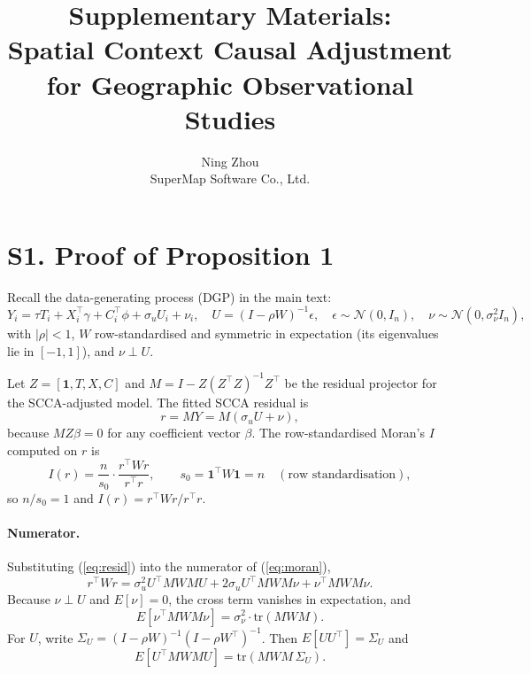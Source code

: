 \documentclass{article}
\title{Supplementary Materials:\\
Spatial Context Causal Adjustment for Geographic Observational Studies}
\author{Ning Zhou\\SuperMap Software Co., Ltd.}
\date{}
\begin{document}
\maketitle

\section{S1. Proof of Proposition 1}

Recall the data-generating process (DGP) in the main text:
\begin{equation}
Y_i = \tau T_i + X_i^\top \gamma + C_i^\top \phi + \sigma_u U_i + \nu_i,
\quad
U = (I - \rho W)^{-1}\epsilon,
\quad \epsilon \sim \mathcal{N}(0, I_n),
\quad \nu \sim \mathcal{N}(0, \sigma_\nu^2 I_n),
\end{equation}
with $|\rho| < 1$, $W$ row-standardised and symmetric in expectation
(its eigenvalues lie in $[-1, 1]$), and $\nu \perp U$.

Let $Z = [\mathbf{1}, T, X, C]$ and $M = I - Z(Z^\top Z)^{-1} Z^\top$ be
the residual projector for the SCCA-adjusted model. The fitted SCCA
residual is
\begin{equation}
r = M Y = M(\sigma_u U + \nu),
\label{eq:resid}
\end{equation}
because $MZ\beta = 0$ for any coefficient vector $\beta$. The
row-standardised Moran's $I$ computed on $r$ is
\begin{equation}
I(r) = \frac{n}{s_0} \cdot \frac{r^\top W r}{r^\top r},
\qquad s_0 = \mathbf{1}^\top W \mathbf{1} = n \quad (\text{row standardisation}),
\label{eq:moran}
\end{equation}
so $n/s_0 = 1$ and $I(r) = r^\top W r / r^\top r$.

\paragraph{Numerator.}
Substituting (\ref{eq:resid}) into the numerator of (\ref{eq:moran}),
\begin{equation}
r^\top W r = \sigma_u^2 U^\top M W M U + 2 \sigma_u U^\top M W M \nu + \nu^\top M W M \nu.
\end{equation}
Because $\nu \perp U$ and $E[\nu] = 0$, the cross term vanishes in
expectation, and
\begin{equation}
E[\nu^\top M W M \nu] = \sigma_\nu^2 \cdot \mathrm{tr}(M W M).
\end{equation}
For $U$, write $\Sigma_U = (I - \rho W)^{-1} (I - \rho W^\top)^{-1}$.
Then $E[U U^\top] = \Sigma_U$ and
\begin{equation}
E[U^\top M W M U] = \mathrm{tr}(M W M \, \Sigma_U).
\end{equation}
\end{document}

